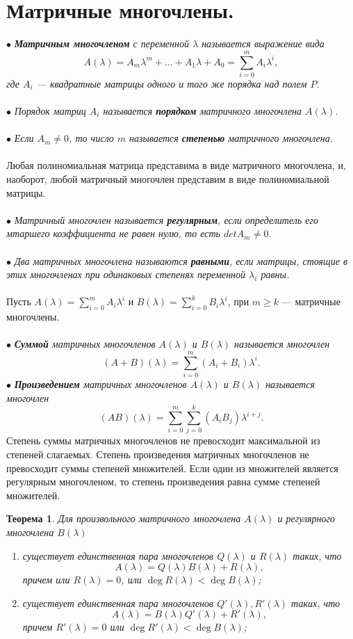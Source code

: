 \section{Матричные многочлены.}
$\bullet$ \textit{\textbf{Матричным многочленом}  с переменной $\lambda$ называется выражение вида} $$A(\lambda) = A_m\lambda^m + \ldots + A_1\lambda + A_0 = \sum\limits_{i=0}^mA_i\lambda^i,$$ \textit{где $A_i$ --- квадратные матрицы одного и того же порядка над полем $P$.}\\\\
$\bullet$ \textit{Порядок матриц $A_i$ называется \textbf{порядком} матричного многочлена $A(\lambda)$.}\\\\
$\bullet$ \textit{Если $A_m \ne 0$, то число $m$ называется \textbf{степенью} матричного многочлена.}\\\\
Любая полиномиальная матрица представима в виде матричного многочлена, и, наоборот, любой матричный многочлен представим в виде полиномиальной матрицы.\\\\
$\bullet$ \textit{Матричный многочлен называется \textbf{регулярным}, если определитель его мтаршего коэффициента не равен нулю, то есть $det A_m \ne 0$.}\\\\
$\bullet$ \textit{Два матричных многочлена называются \textbf{равными}, если матрицы, стоящие в этих многочленах при одинаковых степенях переменной $\lambda_i$ равны.}\\\\
Пусть $A(\lambda) = \sum\limits_{i=0}^mA_i\lambda^i$ и $B(\lambda) = \sum\limits_{i=0}^kB_i\lambda^i$, при $m\geqslant k$ --- матричные многочлены.\\\\
$\bullet$ \textit{\textbf{Суммой} матричных многочленов $A(\lambda)$ и $B(\lambda)$ называется многочлен} $$(A+B)(\lambda)=\sum\limits_{i=0}^m(A_i+B_i)\lambda^i.$$ $\bullet$ \textit{\textbf{Произведением} матричных многочленов $A(\lambda)$ и $B(\lambda)$ называется многочлен} $$(AB)(\lambda)=\sum\limits_{i=0}^m\sum\limits_{j=0}^k(A_iB_j)\lambda^{i+j}.$$
Степень суммы матричных многочленов не превосходит максимальной из степеней слагаемых. Степень произведения матричных многочленов не превосходит суммы степеней множителей. Если один из множителей является регулярным многочленом, то степень произведения равна сумме степеней множителей.
\newtheorem*{th12_5_1}{Теорема}\begin{th12_5_1}
	Для произвольного матричного многочлена $A(\lambda)$ и регулярного многочлена $B(\lambda)$\begin{enumerate}
		\item \textit{существует единственная пара многочленов $Q(\lambda)$ и $R(\lambda)$ таких, что $$A(\lambda) = Q(\lambda)B(\lambda) + R(\lambda),$$ причем или $R(\lambda) = 0$, или $\deg R(\lambda)< \deg B(\lambda)$;}
		\item \textit{существует единственная пара многочленов $Q'(\lambda), R'(\lambda)$ таких, что $$A(\lambda) = B(\lambda)Q'(\lambda) + R'(\lambda),$$ причем $R'(\lambda) = 0$ или $\deg R'(\lambda)< \deg B(\lambda)$;}
	\end{enumerate}
\end{th12_5_1}
